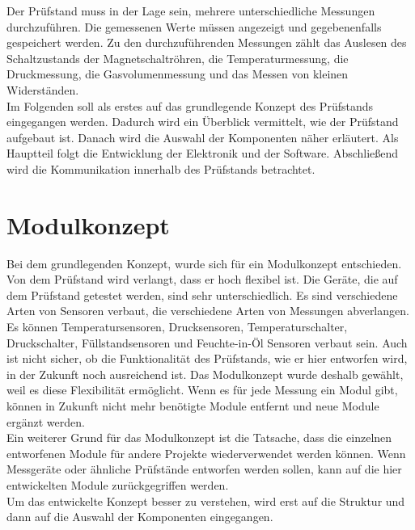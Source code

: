Der Prüfstand muss in der Lage sein, mehrere unterschiedliche Messungen durchzuführen. Die gemessenen Werte müssen angezeigt und gegebenenfalls gespeichert werden. Zu den durchzuführenden Messungen zählt das Auslesen des Schaltzustands der Magnetschaltröhren, die Temperaturmessung, die Druckmessung, die Gasvolumenmessung und das Messen von kleinen Widerständen.
\\
Im Folgenden soll als erstes auf das grundlegende Konzept des Prüfstands eingegangen werden. Dadurch wird ein Überblick vermittelt, wie der Prüfstand aufgebaut ist. Danach wird die Auswahl der Komponenten näher erläutert. Als Hauptteil folgt die Entwicklung der Elektronik und der Software. Abschließend wird die Kommunikation innerhalb des Prüfstands betrachtet.

\section{Modulkonzept}
Bei dem grundlegenden Konzept, wurde sich für ein Modulkonzept entschieden. Von dem Prüfstand wird verlangt, dass er hoch flexibel ist. Die Geräte, die auf dem Prüfstand getestet werden, sind sehr unterschiedlich. Es sind verschiedene Arten von Sensoren verbaut, die verschiedene Arten von Messungen abverlangen. Es können Temperatursensoren, Drucksensoren, Temperaturschalter, Druckschalter, Füllstandsensoren und Feuchte-in-Öl Sensoren verbaut sein. Auch ist nicht sicher, ob die Funktionalität des Prüfstands, wie er hier entworfen wird, in der Zukunft noch ausreichend ist. Das Modulkonzept wurde deshalb gewählt, weil es diese Flexibilität ermöglicht. Wenn es für jede Messung ein Modul gibt, können in Zukunft nicht mehr benötigte Module entfernt und neue Module ergänzt werden.
\\
Ein weiterer Grund für das Modulkonzept ist die Tatsache, dass die einzelnen entworfenen Module für andere Projekte wiederverwendet werden können. Wenn Messgeräte oder ähnliche Prüfstände entworfen werden sollen, kann auf die hier entwickelten Module zurückgegriffen werden.
\\
Um das entwickelte Konzept besser zu verstehen, wird erst auf die Struktur und dann auf die Auswahl der Komponenten eingegangen.

